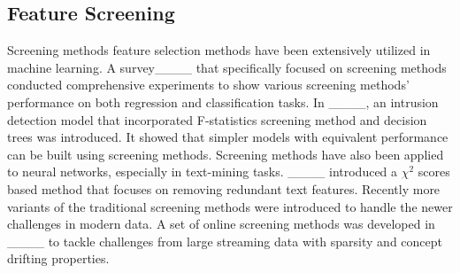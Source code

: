 \subsection{Feature Screening} %
Screening methods feature selection methods have been extensively utilized in machine learning. A survey____ that specifically focused on screening methods conducted comprehensive experiments to show various screening methods' performance on both regression and classification tasks. 
In ____, an intrusion detection model that incorporated F-statistics screening method and decision trees was introduced. It showed that simpler models with equivalent performance can be built using screening methods. 
Screening methods have also been applied to neural networks, especially in text-mining tasks. ____ introduced a $\chi^2$ scores based method that focuses on removing redundant text features. 
Recently more variants of the traditional screening methods were introduced to handle the newer challenges in modern data. A set of online screening methods was developed in ____ to tackle challenges from large streaming data with sparsity and concept drifting properties. 

